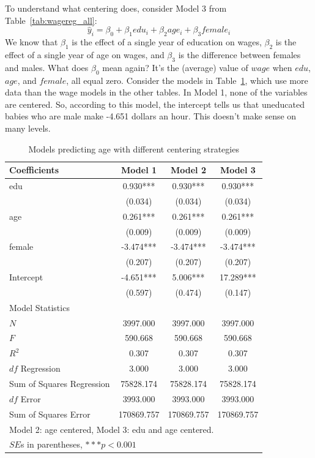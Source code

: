 To understand what centering does, consider Model 3 from Table~\ref{tab:wagereg_all}:
\[
\hat{y}_i=\beta_0+\beta_1edu_i+\beta_2age_i+\beta_3female_i
\]
We know that $\beta_1$ is the effect of a single year of education on wages, $\beta_2$ is the effect of a single year of age on wages, and $\beta_3$ is the difference between females and males. What does $\beta_0$ mean again? It's the (average) value of $wage$ when $edu$, $age$, and $female$, all equal zero. Consider the models in Table~\ref{tab:wagecenter}, which use more data than the wage models in the other tables. In Model 1, none of the variables are centered.  So, according to this model, the intercept tells us that uneducated babies who are male make -4.651 dollars an hour. This doesn't make sense on many levels.
\begin{table}[htbp]\centering
\caption{Models predicting age with different centering strategies
\label{tab:wagecenter}}
\begin{tabular}{lccc}
\hline
Coefficients&Model 1&Model 2&Model 3 \\
\hline
edu &    0.930***&    0.930***&    0.930***\\
      &   (0.034)  &   (0.034)  &   (0.034)  \\
age     &    0.261***&    0.261***&    0.261***\\
      &   (0.009)  &   (0.009)  &   (0.009)  \\
female   &   -3.474***&   -3.474***&   -3.474***\\
      &   (0.207)  &   (0.207)  &   (0.207)  \\
Intercept    &   -4.651***&    5.006***&   17.289***\\
      &   (0.597)  &   (0.474)  &   (0.147)  \\
\hline
\multicolumn{4}{l}{Model Statistics} \\
\hline
$N$ 							&  3997.000  &  3997.000  &  3997.000  \\
$F$ 							&   590.668  &   590.668  &   590.668  \\
$R^2$ 						&    0.307  &    0.307  &    0.307  \\
$df$ Regression 			&    3.000  &    3.000  &    3.000  \\
Sum of Squares Regression 	&  75828.174  &  75828.174  &  75828.174  \\
$df$ Error 					&  3993.000  &  3993.000  &  3993.000  \\
Sum of Squares Error 		& 170869.757  & 170869.757  & 170869.757  \\
\hline
\multicolumn{4}{l}{Model 2: age centered, Model 3: edu and age centered.} \\
\multicolumn{4}{l}{$SE$s in parentheses, $***p<0.001$} \\
\hline
\end{tabular}
\end{table}
